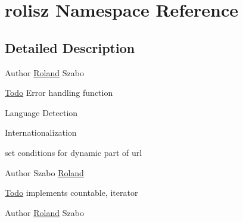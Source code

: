 \hypertarget{namespacerolisz}{
\section{rolisz Namespace Reference}
\label{namespacerolisz}
}


\subsection{Detailed Description}
\begin{DoxyAuthor}{Author}
\hyperlink{namespace_roland}{Roland} Szabo 
\end{DoxyAuthor}
\begin{Desc}
\item[\hyperlink{todo__todo000001}{Todo}]Error handling function 

Language Detection 

Internationalization 

set conditions for dynamic part of url \end{Desc}


\begin{DoxyAuthor}{Author}
Szabo \hyperlink{namespace_roland}{Roland} 
\end{DoxyAuthor}
\begin{Desc}
\item[\hyperlink{todo__todo000002}{Todo}]implements countable, iterator \end{Desc}


\begin{DoxyAuthor}{Author}
\hyperlink{namespace_roland}{Roland} Szabo 
\end{DoxyAuthor}
